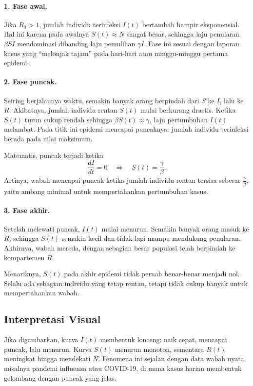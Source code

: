 \documentclass{bukumjh}
\begin{document}
\paragraph{1. Fase awal.}  
Jika $R_0 > 1$, jumlah individu terinfeksi $I(t)$ bertambah hampir eksponensial. Hal ini karena pada awalnya $S(t) \approx N$ sangat besar, sehingga laju penularan $\beta S I$ mendominasi dibanding laju pemulihan $\gamma I$. Fase ini sesuai dengan laporan kasus yang “melonjak tajam” pada hari-hari atau minggu-minggu pertama epidemi.

\paragraph{2. Fase puncak.}  
Seiring berjalannya waktu, semakin banyak orang berpindah dari $S$ ke $I$, lalu ke $R$. Akibatnya, jumlah individu rentan $S(t)$ mulai berkurang drastis. Ketika $S(t)$ turun cukup rendah sehingga $\beta S(t) \approx \gamma$, laju pertumbuhan $I(t)$ melambat. Pada titik ini epidemi mencapai puncaknya: jumlah individu terinfeksi berada pada nilai maksimum.  

Matematis, puncak terjadi ketika
\[
\frac{dI}{dt} = 0 \quad \Longrightarrow \quad S(t) = \frac{\gamma}{\beta}.
\]
Artinya, wabah mencapai puncak ketika jumlah individu rentan tersisa sebesar $\tfrac{\gamma}{\beta}$, yaitu ambang minimal untuk mempertahankan pertumbuhan kasus.

\paragraph{3. Fase akhir.}  
Setelah melewati puncak, $I(t)$ mulai menurun. Semakin banyak orang masuk ke $R$, sehingga $S(t)$ semakin kecil dan tidak lagi mampu mendukung penularan. Akhirnya, wabah mereda, dengan sebagian besar populasi telah berpindah ke kompartemen $R$.  

Menariknya, $S(t)$ pada akhir epidemi tidak pernah benar-benar menjadi nol. Selalu ada sebagian individu yang tetap rentan, tetapi tidak cukup banyak untuk mempertahankan wabah.

\subsection*{Interpretasi Visual}

Jika digambarkan, kurva $I(t)$ membentuk lonceng: naik cepat, mencapai puncak, lalu menurun. Kurva $S(t)$ menurun monoton, sementara $R(t)$ meningkat hingga mendekati $N$. Fenomena ini sejalan dengan data wabah nyata, misalnya pandemi influenza atau COVID-19, di mana kasus harian membentuk gelombang dengan puncak yang jelas.
\end{document}
